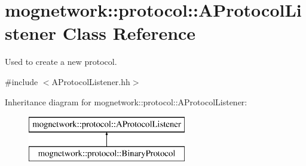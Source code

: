 \hypertarget{classmognetwork_1_1protocol_1_1_a_protocol_listener}{\section{mognetwork\-:\-:protocol\-:\-:A\-Protocol\-Listener Class Reference}
\label{classmognetwork_1_1protocol_1_1_a_protocol_listener}
}


Used to create a new protocol.  




{\ttfamily \#include $<$A\-Protocol\-Listener.\-hh$>$}

Inheritance diagram for mognetwork\-:\-:protocol\-:\-:A\-Protocol\-Listener\-:\begin{figure}[H]
\begin{center}
\leavevmode
\includegraphics[height=2.000000cm]{classmognetwork_1_1protocol_1_1_a_protocol_listener}
\end{center}
\end{figure}
